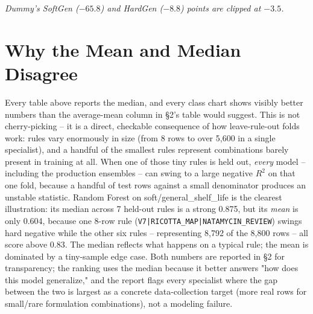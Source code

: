 \documentclass[11pt]{article}
\begin{document}
\begin{center}
\end{center}
\vspace{-0.3em}
\textit{Dummy's SoftGen ($-65.8$) and HardGen ($-8.8$) points are clipped
at $-3.5$.}

\section{Why the Mean and Median Disagree}
Every table above reports the median, and every class chart shows visibly
better numbers than the average-mean column in \S2's table would suggest.
This is not cherry-picking -- it is a direct, checkable consequence of how
leave-rule-out folds work: rules vary enormously in size (from 8 rows to
over 5,600 in a single specialist), and a handful of the smallest rules
represent combinations barely present in training at all. When one of
those tiny rules is held out, \emph{every} model -- including the
production ensembles -- can swing to a large negative $R^2$ on that one
fold, because a handful of test rows against a small denominator produces
an unstable statistic. Random Forest on soft/general\_shelf\_life is the
clearest illustration: its median across 7 held-out rules is a strong
0.875, but its \emph{mean} is only 0.604, because one 8-row rule
(\texttt{V7|RICOTTA\_MAP|NATAMYCIN\_REVIEW}) swings hard negative while the
other six rules -- representing 8{,}792 of the 8{,}800 rows -- all score
above 0.83. The median reflects what happens on a typical rule; the mean
is dominated by a tiny-sample edge case. Both numbers are reported in \S2
for transparency; the ranking uses the median because it better answers
"how does this model generalize," and the report flags every specialist
where the gap between the two is largest as a concrete data-collection
target (more real rows for small/rare formulation combinations), not a
modeling failure.
\end{document}
